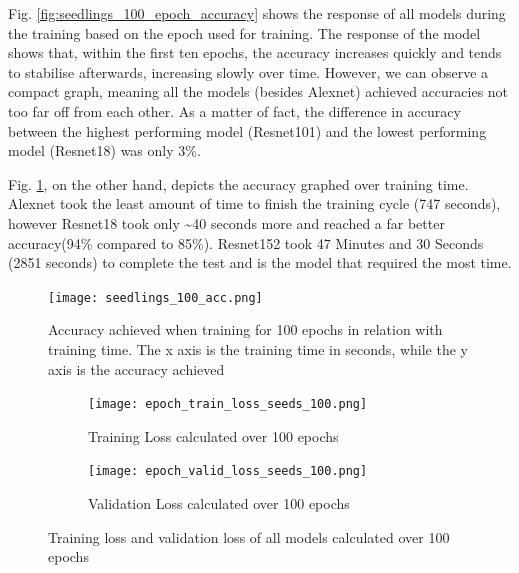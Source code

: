 Fig. \ref{fig:seedlings_100_epoch_accuracy} shows the response of all models during the training based on the epoch used for training. The response of the model shows that, within the first ten epochs, the accuracy increases quickly and tends to stabilise afterwards, increasing slowly over time. However, we can observe a compact graph, meaning all the models (besides Alexnet) achieved accuracies not too far off from each other.
As a matter of fact, the difference in accuracy between the highest performing model (Resnet101) and the lowest performing model (Resnet18) was only 3\%.  


Fig. \ref{fig:seedlings_100_acc}, on the other hand, depicts the accuracy graphed over training time. Alexnet took the least amount of time to finish the training cycle (747 seconds), however Resnet18 took only \textasciitilde40 seconds more and reached a far better accuracy(94\% compared to 85\%). Resnet152 took 47 Minutes and 30 Seconds (2851 seconds) to complete the test and is the model that required the most time. \\
\begin{figure}[h]
       \centering 
	    \texttt{[image: seedlings\_100\_acc.png]}
        \caption[Accuracy achieved when training for 100 epochs in relation with training time]{Accuracy achieved when training for 100 epochs in relation with training time. The x axis is the training time in seconds, while the y axis is the accuracy achieved}
         \label{fig:seedlings_100_acc}
\end{figure}

\begin{figure}[h]
\begin{subfigure}{0.5\textwidth}
	    \texttt{[image: epoch\_train\_loss\_seeds\_100.png]}
	    \caption{Training Loss calculated over 100 epochs}
        \label{fig:train_loss_seeds_100}
     \end{subfigure} \hfill
     \begin{subfigure}{0.5\textwidth}
	    \texttt{[image: epoch\_valid\_loss\_seeds\_100.png]}
	    \caption{Validation Loss calculated over 100 epochs}
         \label{fig:valid_loss_seeds_100}
     \end{subfigure}
     
     \caption{Training loss and validation loss of all models calculated over 100 epochs}
        \label{fig:tran_valid_loss_seeds_100}
        
      
\end{figure}

